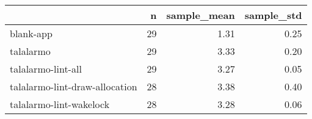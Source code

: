 \begin{tabular}{lrrr}
\toprule
{} &   n &  sample\_mean &  sample\_std \\
\midrule
blank-app                      &  29 &         1.31 &        0.25 \\
talalarmo                      &  29 &         3.33 &        0.20 \\
talalarmo-lint-all             &  29 &         3.27 &        0.05 \\
talalarmo-lint-draw-allocation &  28 &         3.38 &        0.40 \\
talalarmo-lint-wakelock        &  28 &         3.28 &        0.06 \\
\bottomrule
\end{tabular}
